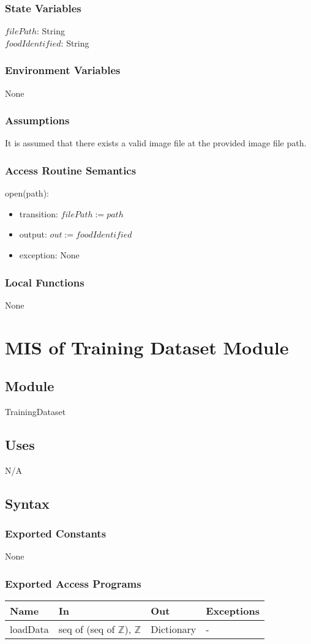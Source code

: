\documentclass[12pt, titlepage]{article}
\begin{document}
\subsubsection{State Variables}
$filePath$: String\\
$foodIdentified$: String
\subsubsection{Environment Variables}
None
\subsubsection{Assumptions}
It is assumed that there exists a valid image file at the provided image file path.
\subsubsection{Access Routine Semantics}
\noindent open(path):
\begin{itemize}
	\item transition: $filePath := path$
	\item output: $out := foodIdentified$
	\item exception: None
\end{itemize}
\subsubsection{Local Functions}
None

\newpage

\section{MIS of Training Dataset Module} \label{TrainingDataset}
\subsection{Module}
TrainingDataset
\subsection{Uses}
N/A
\subsection{Syntax}
\subsubsection{Exported Constants}
None
\subsubsection{Exported Access Programs}
\begin{center}
	\begin{tabular}{p{2cm} p{5cm} p{5cm} p{2cm}}
		\hline
		\textbf{Name} & \textbf{In} & \textbf{Out} & \textbf{Exceptions} \\
		\hline
		loadData & seq of (seq of $\mathbb{Z}$), $\mathbb{Z}$ & Dictionary & - \\
		\hline
	\end{tabular}
\end{center}
\end{document}
